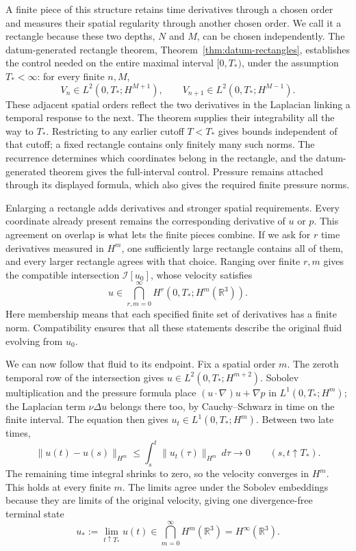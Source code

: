 A finite piece of this structure retains time derivatives through a chosen
order and measures their spatial regularity through another chosen order.
We call it a rectangle because these two depths, \(N\) and \(M\), can be
chosen independently. The datum-generated rectangle theorem,
Theorem~\ref{thm:datum-rectangles}, establishes the control needed on the
entire maximal interval \([0,T_*)\), under the assumption \(T_*<\infty\):
for every finite \(n,M\),
\[
 V_n\in L^2(0,T_*;H^{M+1}),
 \qquad
 V_{n+1}\in L^2(0,T_*;H^{M-1}).
\]
These adjacent spatial orders reflect the two derivatives in the Laplacian
linking a temporal response to the next. The theorem supplies their
integrability all the way to \(T_*\). Restricting to any earlier cutoff
\(T<T_*\) gives bounds independent of that cutoff; a fixed rectangle
contains only finitely many such norms. The recurrence determines which
coordinates belong in the rectangle, and the datum-generated theorem gives
the full-interval control. Pressure remains attached through its displayed
formula, which also gives the required finite pressure norms.

Enlarging a rectangle adds derivatives and stronger spatial requirements.
Every coordinate already present remains the corresponding derivative of
\(u\) or \(p\). This agreement on overlap is what lets the finite pieces
combine. If we ask for \(r\) time derivatives measured in \(H^m\), one
sufficiently large rectangle contains all of them, and every larger rectangle
agrees with that choice. Ranging over finite \(r,m\) gives the compatible
intersection \(\mathcal I[u_0]\), whose velocity satisfies
\[
 u\in\bigcap_{r,m=0}^{\infty}H^r(0,T_*;H^m(\mathbb R^3)).
\]
Here membership means that each specified finite set of derivatives has a
finite norm. Compatibility ensures that all these statements describe the
original fluid evolving from \(u_0\).

We can now follow that fluid to its endpoint. Fix a spatial order \(m\).
The zeroth temporal row of the intersection gives
\(u\in L^2(0,T_*;H^{m+2})\). Sobolev multiplication and the pressure formula
place \((u\!\cdot\nabla)u+\nabla p\) in \(L^1(0,T_*;H^m)\); the
Laplacian term \(\nu\Delta u\) belongs there too, by Cauchy--Schwarz in time
on the finite interval. The equation
then gives \(u_t\in L^1(0,T_*;H^m)\). Between two late times,
\[
 \|u(t)-u(s)\|_{H^m}
 \le\int_s^t\|u_t(\tau)\|_{H^m}\,d\tau
 \longrightarrow0
 \qquad(s,t\uparrow T_*).
\]
The remaining time integral shrinks to zero, so the velocity converges in
\(H^m\). This holds at every finite \(m\). The limits agree under the
Sobolev embeddings because they are limits of the original velocity, giving
one divergence-free terminal state
\[
 u_*:=\lim_{t\uparrow T_*}u(t)
 \in\bigcap_{m=0}^{\infty}H^m(\mathbb R^3)
 =H^\infty(\mathbb R^3).
\]

